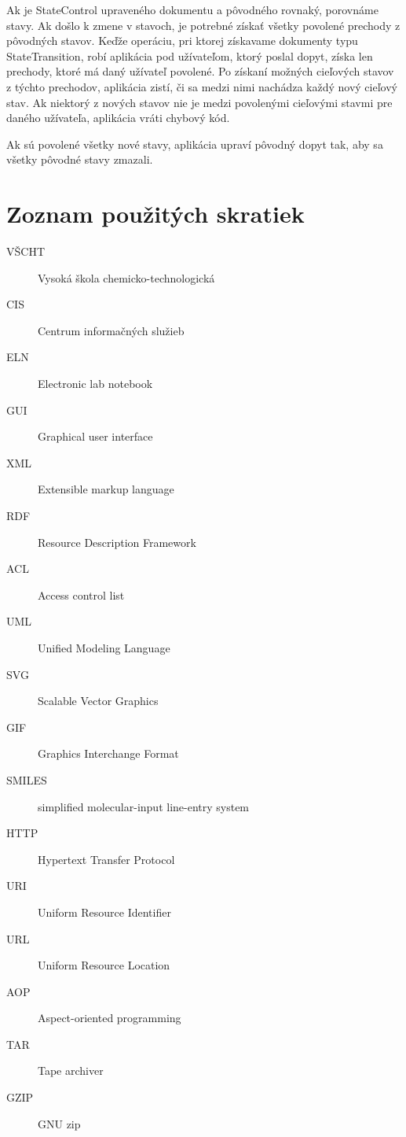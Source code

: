 \documentclass[thesis=M,slovak]{FITthesis}[2013/05/06]
\begin{document}
Ak je StateControl upraveného dokumentu a pôvodného rovnaký, porovnáme stavy. Ak došlo k zmene v stavoch, je potrebné získať všetky povolené prechody z pôvodných stavov. Keďže operáciu, pri ktorej získavame dokumenty typu StateTransition, robí aplikácia pod užívateľom, ktorý poslal dopyt, získa len prechody, ktoré má daný užívateľ povolené.
Po získaní možných cieľových stavov z týchto prechodov, aplikácia zistí, či sa medzi nimi nachádza každý nový cieľový stav. Ak niektorý z nových stavov nie je medzi povolenými cieľovými stavmi pre daného užívateľa, aplikácia vráti chybový kód.

Ak sú povolené všetky nové stavy, aplikácia upraví pôvodný dopyt tak, aby sa všetky pôvodné stavy zmazali.

\begin{conclusion}
\end{conclusion}




\appendix

\chapter{Zoznam použitých skratiek}
\begin{description}
	\item[VŠCHT] Vysoká škola chemicko-technologická
	\item[CIS] Centrum informačných služieb
	\item[ELN] Electronic lab notebook
	\item[GUI] Graphical user interface
	\item[XML] Extensible markup language
	\item[RDF] Resource Description Framework
	\item[ACL] Access control list
	\item[UML] Unified Modeling Language
	\item[SVG] Scalable Vector Graphics
	\item[GIF] Graphics Interchange Format
	\item[SMILES] simplified molecular-input line-entry system
	\item[HTTP] Hypertext Transfer Protocol
	\item[URI] Uniform Resource Identifier
	\item[URL] Uniform Resource Location
	\item[AOP] Aspect-oriented programming
	\item[TAR] Tape archiver
	\item[GZIP] GNU zip
\end{description}
\end{document}

